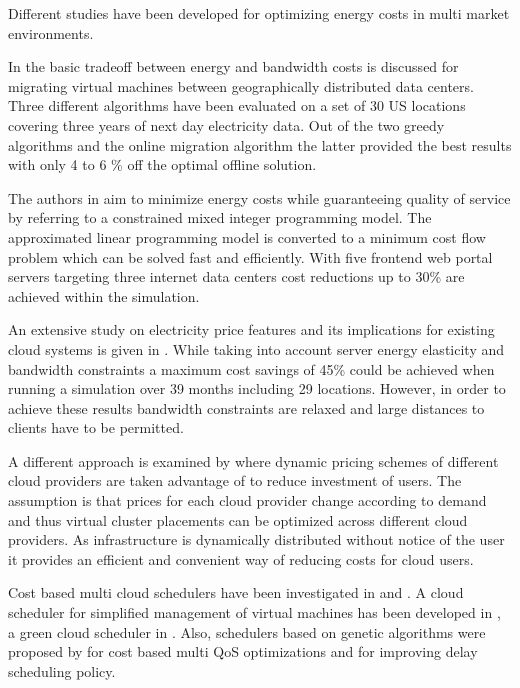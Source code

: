 Different studies have been developed for optimizing energy costs in multi market environments. 

In \cite{buchbinder2011online} the basic tradeoff between energy and bandwidth costs is discussed for migrating virtual machines between geographically distributed data centers. 
Three different algorithms have been evaluated on a set of 30 US locations covering three years of next day electricity data. Out of the two greedy algorithms and the online migration algorithm the latter provided the best results with only 4 to 6 \% off the optimal offline solution. 

The authors in \cite{rao2010minimizing} aim to minimize energy costs while guaranteeing quality of service by referring to a constrained mixed integer programming model. The approximated linear programming model is converted to a minimum cost flow problem which can be solved fast and efficiently. With five frontend web portal servers targeting three internet data centers cost reductions up to 30\% are achieved within the simulation. 

An extensive study on electricity price features and its implications for existing cloud systems is given in \cite{qureshi2009cutting}. While taking into account server energy elasticity and bandwidth constraints a maximum cost savings of 45\% could be achieved when running a simulation over 39 months including 29 locations. However, in order to achieve these results bandwidth constraints are relaxed and large distances to clients have to be permitted. 

A different approach is examined by \cite{simarro2011dynamic} where dynamic pricing schemes of different cloud providers are taken advantage of to reduce investment of users. The assumption is that prices for each cloud provider change according to demand and thus virtual cluster placements can be optimized across different cloud providers. As infrastructure is dynamically distributed without notice of the user it provides an efficient and convenient way of reducing costs for cloud users. 

Cost based multi cloud schedulers have been investigated in \cite{le2009cost} and \cite{tordsson2012cloud}. 
A cloud scheduler for simplified management of virtual machines has been developed in \cite{armstrong2010cloud}, a green cloud scheduler in \cite{lucanin2013take}. 
Also, schedulers based on genetic algorithms were proposed by \cite{dutta2011genetic} for cost based multi QoS optimizations and \cite{ge2010ga} for improving delay scheduling policy. 



